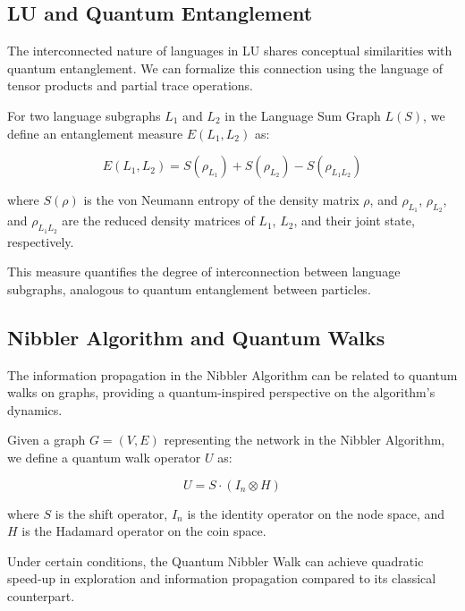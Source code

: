\subsection{LU and Quantum Entanglement}

The interconnected nature of languages in LU shares conceptual similarities with quantum entanglement. We can formalize this connection using the language of tensor products and partial trace operations.

\begin{definition}
For two language subgraphs $L_1$ and $L_2$ in the Language Sum Graph $L(S)$, we define an entanglement measure $E(L_1, L_2)$ as:

\begin{equation}
E(L_1, L_2) = S(\rho_{L_1}) + S(\rho_{L_2}) - S(\rho_{L_1L_2})
\end{equation}

where $S(\rho)$ is the von Neumann entropy of the density matrix $\rho$, and $\rho_{L_1}$, $\rho_{L_2}$, and $\rho_{L_1L_2}$ are the reduced density matrices of $L_1$, $L_2$, and their joint state, respectively.
\end{definition}

This measure quantifies the degree of interconnection between language subgraphs, analogous to quantum entanglement between particles.

\subsection{Nibbler Algorithm and Quantum Walks}


The information propagation in the Nibbler Algorithm can be related to quantum walks on graphs, providing a quantum-inspired perspective on the algorithm's dynamics.

\begin{definition}
Given a graph $G = (V, E)$ representing the network in the Nibbler Algorithm, we define a quantum walk operator $U$ as:

\begin{equation}
U = S \cdot (I_n \otimes H)
\end{equation}

where $S$ is the shift operator, $I_n$ is the identity operator on the node space, and $H$ is the Hadamard operator on the coin space.
\end{definition}

\begin{proposition}
Under certain conditions, the Quantum Nibbler Walk can achieve quadratic speed-up in exploration and information propagation compared to its classical counterpart.
\end{proposition}

